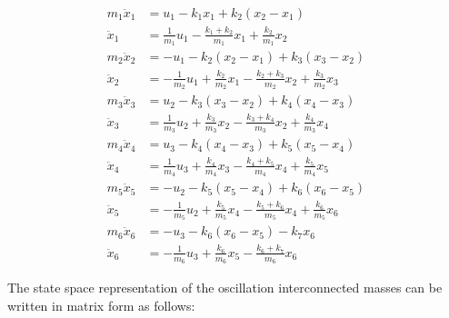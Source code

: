 \documentclass[12pt]{article}
\begin{document}
\begin{subequations} 
	\label{eqn:dynamical_equations}
	\begin{align} 
		m_{1}\ddot{x}_{1} &= u_{1} - k_{1}x_{1} + k_{2}(x_{2}-x_{1}) \\ 
		\ddot{x}_{1} &= \frac{1}{m_{1}}u_{1} - \frac{k_{1}+k_{2}}{m_{1}}x_{1} + \frac{k_{2}}{m_{1}}x_{2} \nonumber \\ 
		m_{2}\ddot{x}_{2} &= -u_{1} - k_{2}(x_{2}-x_{1}) + k_{3}(x_{3}-x_{2}) \\ 
		\ddot{x}_{2} &= -\frac{1}{m_{2}}u_{1} + \frac{k_{2}}{m_{2}}x_{1} -   \frac{k_{2}+k_{3}}{m_{2}}x_{2} + \frac{k_{3}}{m_{2}}x_{3} \nonumber \\
		m_{3}\ddot{x}_{3} &= u_{2} - k_{3}(x_{3}-x_{2}) + k_{4}(x_{4}-x_{3}) \\ 
		\ddot{x}_{3} &= \frac{1}{m_{3}}u_{2} + \frac{k_{3}}{m_{3}}x_{2} -   \frac{k_{3}+k_{4}}{m_{3}}x_{2} + \frac{k_{4}}{m_{3}}x_{4} \nonumber \\	
		m_{4}\ddot{x}_{4} &= u_{3} - k_{4}(x_{4}-x_{3}) + k_{5}(x_{5}-x_{4}) \\ 
		\ddot{x}_{4} &= \frac{1}{m_{4}}u_{3} + \frac{k_{4}}{m_{4}}x_{3} -   \frac{k_{4}+k_{5}}{m_{4}}x_{4} + \frac{k_{5}}{m_{4}}x_{5} \nonumber \\
		m_{5}\ddot{x}_{5} &= -u_{2} - k_{5}(x_{5}-x_{4}) + k_{6}(x_{6}-x_{5}) \\ 
		\ddot{x}_{5} &= -\frac{1}{m_{5}}u_{2} + \frac{k_{5}}{m_{5}}x_{4} -   \frac{k_{5}+k_{6}}{m_{5}}x_{4} + \frac{k_{6}}{m_{5}}x_{6} \nonumber \\	 		
		m_{6}\ddot{x}_{6} &= -u_{3} - k_{6}(x_{6}-x_{5}) - k_{7}x_{6} \\ 
		\ddot{x}_{6} &= -\frac{1}{m_{6}}u_{3} + \frac{k_{6}}{m_{6}}x_{5} -   \frac{k_{6}+k_{7}}{m_{6}}x_{6} \nonumber 
	\end{align} 
\end{subequations}
\par\noindent The state space representation of the oscillation interconnected masses can be written in matrix form as follows:  
\end{document}
